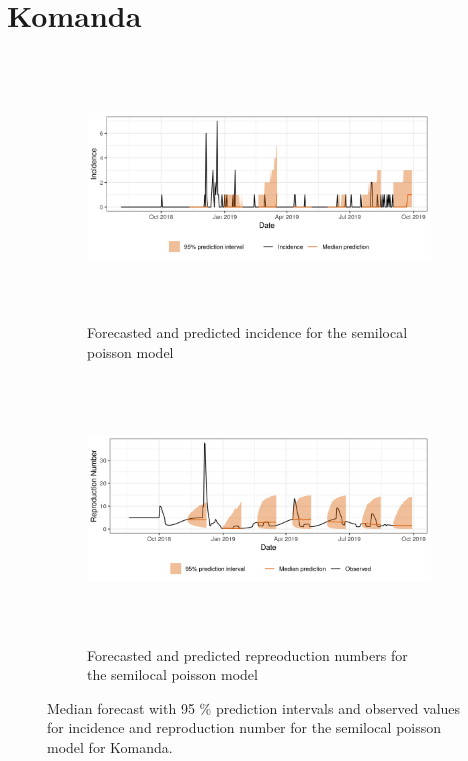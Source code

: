  \section{ Komanda }\begin{figure}[H]\begin{subfigure}{\textwidth}  \centering  \includegraphics[width=0.9\linewidth, height=7cm]{../output/Komanda_predictions.png}  \caption{Forecasted and predicted incidence for the semilocal poisson model}\end{subfigure}

\begin{subfigure}{\textwidth}  \centering  \includegraphics[width=0.9\linewidth, height=7cm]{../output/Komanda_Rs.png}  \caption{Forecasted and predicted repreoduction numbers for the semilocal poisson model}\end{subfigure}  \caption{Median forecast with 95 \% prediction intervals and observed values for incidence and reproduction number for the semilocal poisson model for Komanda.}\end{figure}

